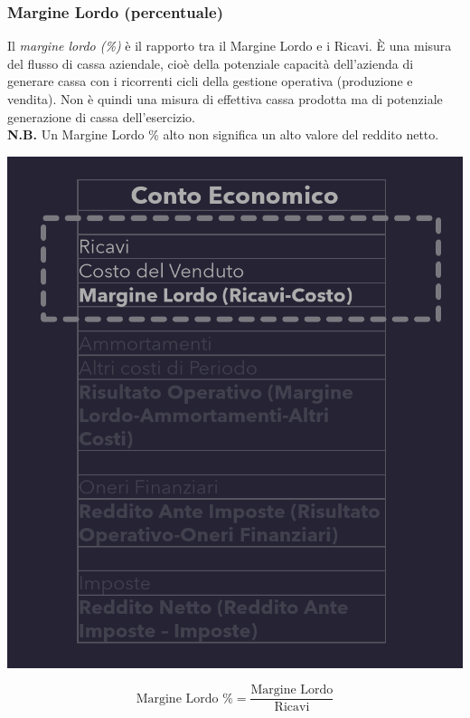 \documentclass{article}
\begin{document}
\subsubsection{Margine Lordo (percentuale)}
Il \textit{margine lordo (\%)} è il rapporto tra il Margine Lordo e i Ricavi. È una misura del flusso di cassa aziendale, cioè della potenziale capacità dell'azienda di generare cassa con i ricorrenti cicli della gestione operativa (produzione e vendita). Non è quindi una misura di effettiva cassa prodotta ma di potenziale generazione di cassa dell'esercizio.\\
\textbf{N.B.} Un Margine Lordo \% alto non significa un alto valore del reddito netto.
\begin{center}
    \includegraphics[scale=0.3]{Image/MargineLordo_1.png}
\end{center}
\[
    \text{Margine Lordo \%} = \frac{\text{Margine Lordo}}{\text{Ricavi}}
\]
\end{document}
